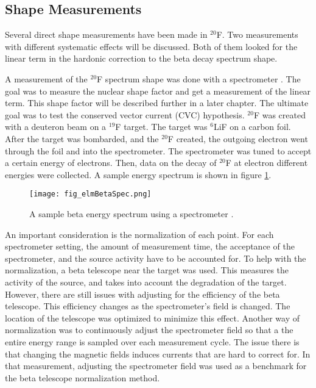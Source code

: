 \documentclass[../MaxHughesThesis.tex]{subfiles}
\begin{document}
\subsection{Shape Measurements} 

Several direct shape measurements have been made in $^{20}$F.
Two measurements with different systematic effects will be discussed.
Both of them looked for the linear term in the hardonic correction to the beta decay spectrum shape. 

A measurement of the $^{20}$F spectrum shape was done with a spectrometer \cite{Elm87}.
The goal was to measure the nuclear shape factor and get a measurement of the linear term.
This shape factor will be described further in a later chapter.
The ultimate goal was to test the conserved vector current (CVC) hypothesis. 
$^{20}$F was created with a deuteron beam on a $^{19}$F target.
The target was $^{6}$LiF on a carbon foil.
After the target was bombarded, and the $^{20}$F created, the outgoing electron went through the foil and into the spectrometer.
The spectrometer was tuned to accept a certain energy of electrons. 
Then, data on the decay of $^{20}$F at electron different energies were collected.
A sample energy spectrum is shown in figure \ref{fig:elmspec}.

\begin{figure}[!htb]
	\centerline{\texttt{[image: fig\_elmBetaSpec.png]}}
	\caption{A sample beta energy spectrum using a spectrometer \cite{Elm87}.}
	\label{fig:elmspec}
\end{figure}

An important consideration is the normalization of each point.
For each spectrometer setting, the amount of measurement time, the acceptance of the spectrometer, and the source activity have to be accounted for.
To help with the normalization, a beta telescope near the target was used.
This measures the activity of the source, and takes into account the degradation of the target.
However, there are still issues with adjusting for the efficiency of the beta telescope.
This efficiency changes as the spectrometer's field is changed.
The location of the telescope was optimized to minimize this effect.
Another way of normalization was to continuously adjust the spectrometer field so that a the entire energy range is sampled over each measurement cycle.
The issue there is that changing the magnetic fields induces currents that are hard to correct for. 
In that measurement, adjusting the spectrometer field was used as a benchmark for the beta telescope normalization method.
\end{document}

